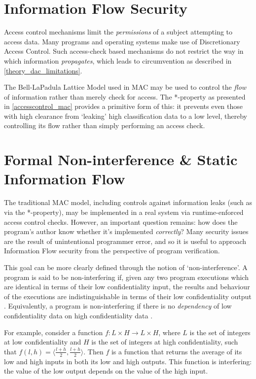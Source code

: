 \section{Information Flow Security}

Access control mechanisms limit the \textit{permissions} of a subject attempting to access data. Many programs and operating systems make use of Discretionary Access Control. Such access-check based mechanisms do not restrict the way in which information \textit{propagates}, which leads to circumvention as described in \ref{theory_dac_limitations}.

The Bell-LaPadula Lattice Model used in MAC may be used to control the \textit{flow} of information rather than merely check for access. The *-property as presented in \ref{accesscontrol_mac} provides a primitive form of this: it prevents even those with high clearance from `leaking' high classification data to a low level, thereby controlling its flow rather than simply performing an access check.

\section{Formal Non-interference \& Static Information Flow} \label{theory_if_noninterference}

The traditional MAC model, including controls against information leaks (such as via the *-property), may be implemented in a real system via runtime-enforced access control checks. However, an important question remains: how does the program's author know whether it's implemented \textit{correctly}? Many security issues are the result of unintentional programmer error, and so it is useful to approach Information Flow security from the perspective of program verification.

This goal can be more clearly defined through the notion of `non-interference'. A program is said to be non-interfering if, given any two program executions which are identical in terms of their low confidentiality input, the results and behaviour of the executions are indistinguishable in terms of their low confidentiality output \cite{sabelfeld2003if}. Equivalently, a program is non-interfering if there is no \textit{dependency} of low confidentiality data on high confidentiality data \cite{cohen1977declassification}.

For example, consider a function $ f: L \times H \rightarrow L \times H $, where $ L $ is the set of integers at low confidentiality and $ H $ is the set of integers at high confidentiality, such that $ f(l, h) = \langle \frac{l + h}{2}, \frac{l + h}{2} \rangle $. Then $ f $ is a function that returns the average of its low and high inputs in both its low and high outputs. This function is interfering: the value of the low output depends on the value of the high input.

